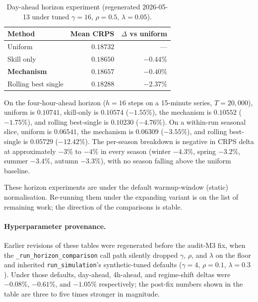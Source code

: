 \documentclass[
  11pt,
  a4paper,
  oneside]{report}
\begin{document}
\begin{table}[h]
\centering
\small
\begin{tabular}{lrr}
\toprule
Method & Mean CRPS & $\Delta$ vs uniform \\
\midrule
Uniform & $0.18732$ & --- \\
Skill only & $0.18650$ & $-0.44\%$ \\
\textbf{Mechanism} & $\mathbf{0.18657}$ & $\mathbf{-0.40\%}$ \\
Rolling best single & $0.18288$ & $-2.37\%$ \\
\bottomrule
\end{tabular}
\caption{Day-ahead horizon experiment (regenerated 2026-05-13 under
tuned \(\gamma = 16\), \(\rho = 0.5\), \(\lambda = 0.05\)).}
\label{tab:horizon-day-ahead}
\end{table}

\noindent On the four-hour-ahead horizon (\(h = 16\) steps on a
15-minute series, \(T = 20{,}000\)), uniform is \(0.10741\),
skill-only is \(0.10574\) (\(-1.55\%\)), the mechanism is \(0.10552\)
(\(-1.75\%\)), and rolling best-single is \(0.10230\) (\(-4.76\%\)).
On a within-run seasonal slice, uniform is \(0.06541\), the mechanism
is \(0.06309\) (\(-3.55\%\)), and rolling best-single is \(0.05729\)
(\(-12.42\%\)). The per-season breakdown is negative in CRPS delta at
approximately \(-3\%\) to \(-4\%\) in every season (winter
\(-4.3\%\), spring \(-3.2\%\), summer \(-3.4\%\), autumn \(-3.3\%\)),
with no season falling above the uniform baseline.

These horizon experiments are under the default warmup-window (static)
normalisation. Re-running them under the expanding variant is on the
list of remaining work; the direction of the comparisons is stable.

\paragraph{Hyperparameter provenance.} Earlier revisions of these
tables were regenerated before the audit-M3 fix, when the
\texttt{\_run\_horizon\_comparison} call path silently dropped
\(\gamma\), \(\rho\), and \(\lambda\) on the floor and inherited
\texttt{run\_simulation}'s synthetic-tuned defaults (\(\gamma = 4\),
\(\rho = 0.1\), \(\lambda = 0.3\)). Under those defaults, day-ahead,
4h-ahead, and regime-shift deltas were \(-0.08\%\), \(-0.61\%\), and
\(-1.05\%\) respectively; the post-fix numbers shown in the table are
three to five times stronger in magnitude.
\end{document}
